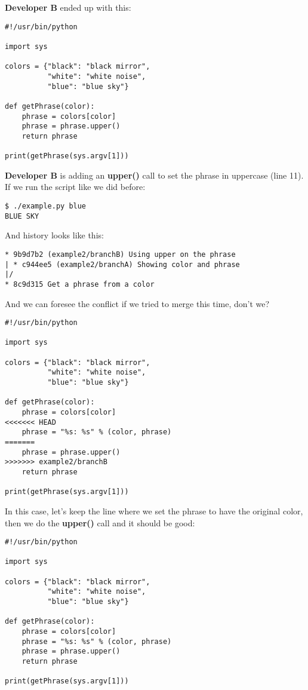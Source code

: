 {\bf Developer B} ended up with this:
\begin{lstlisting}[style=python_style, caption={\bf example 2} - Developer B]
#!/usr/bin/python

import sys

colors = {"black": "black mirror",
          "white": "white noise",
          "blue": "blue sky"}

def getPhrase(color):
    phrase = colors[color]
    phrase = phrase.upper()
    return phrase

print(getPhrase(sys.argv[1]))
\end{lstlisting}

{\bf Developer B} is adding an {\bf upper()} call to set the phrase in uppercase (line 11). If we run the script
like we did before:

\begin{lstlisting}[style=console_style, caption={\bf example 2} - running script from Developer B]
$ ./example.py blue
BLUE SKY
\end{lstlisting}

And history looks like this:
\begin{lstlisting}[style=console_style, caption={\bf example 2} - branch history]
* 9b9d7b2 (example2/branchB) Using upper on the phrase
| * c944ee5 (example2/branchA) Showing color and phrase
|/  
* 8c9d315 Get a phrase from a color
\end{lstlisting}

And we can foresee the conflict if we tried to merge this time, don't we?
\begin{lstlisting}[style=python_style, caption={\bf example 2} - Conflicted file]
#!/usr/bin/python

import sys

colors = {"black": "black mirror",
          "white": "white noise",
          "blue": "blue sky"}

def getPhrase(color):
    phrase = colors[color]
<<<<<<< HEAD
    phrase = "%s: %s" % (color, phrase)
=======
    phrase = phrase.upper()
>>>>>>> example2/branchB
    return phrase

print(getPhrase(sys.argv[1]))
\end{lstlisting}

In this case, let's keep the line where we set the phrase to have the original color, then we do the {\bf upper()} call
and it should be good:
\begin{lstlisting}[style=python_style, caption={\bf example 2} - Resolved conflict]
#!/usr/bin/python

import sys

colors = {"black": "black mirror",
          "white": "white noise",
          "blue": "blue sky"}

def getPhrase(color):
    phrase = colors[color]
    phrase = "%s: %s" % (color, phrase)
    phrase = phrase.upper()
    return phrase

print(getPhrase(sys.argv[1]))
\end{lstlisting}


